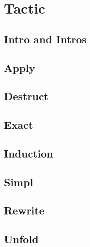 \section{Tactic}
\subsection{Intro and Intros}

\subsection{Apply}

\subsection{Destruct}

\subsection{Exact}

\subsection{Induction}

\subsection{Simpl}

\subsection{Rewrite}

\subsection{Unfold}

